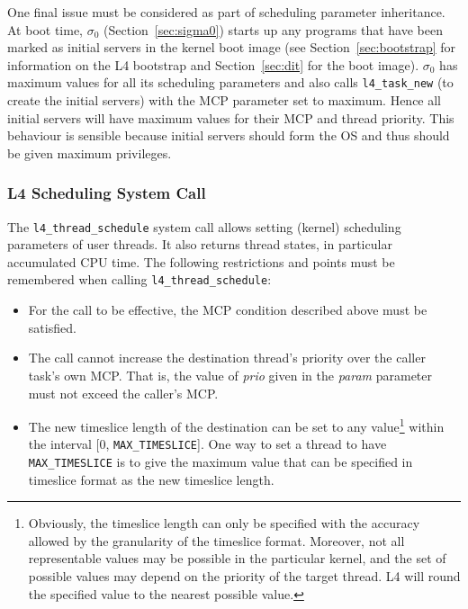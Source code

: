 One final issue must be considered as part of scheduling parameter
inheritance. At boot time, $\sigma_0$ (Section~\ref{sec:sigma0})
starts up any programs that have been marked as initial servers in the
kernel boot image (see Section~\ref{sec:bootstrap} for information on
the L4 bootstrap and Section~\ref{sec:dit} for the boot image).
$\sigma_0$ has maximum values for all its scheduling parameters and
also calls {\footnotesize\verb+l4_task_new+} (to create the initial servers) with the
MCP parameter set to maximum.  Hence all initial servers will have
maximum values for their MCP and thread priority. This behaviour is
sensible because initial servers should form the OS and thus should be
given maximum privileges.


\subsubsection{L4 Scheduling System Call}

The {\footnotesize\verb+l4_thread_schedule+} system call allows setting (kernel)
scheduling parameters of user threads.  It also returns thread states,
in particular accumulated CPU time. The following restrictions and
points must be remembered when calling {\footnotesize\verb+l4_thread_schedule+}:

\begin{itemize}
  
\item For the call to be effective, the MCP condition described above
  must be satisfied.

\item The call cannot increase the destination thread's priority over
  the caller task's own MCP. That is, the value of \emph{prio} given
  in the \emph{param} parameter must not exceed the caller's MCP.

\item The new timeslice length of the destination can be set to any
  value\footnote{Obviously, the timeslice length can only be specified
  with the accuracy allowed by the granularity of the timeslice
  format. Moreover, not all representable values may be possible in the
  particular kernel, and the set of possible values may depend on the
  priority of the target thread. L4 will round the specified value to
  the nearest possible value.} within the interval [0,
  {\footnotesize\verb+MAX_TIMESLICE+}]. One way to set a thread to have
  {\footnotesize\verb+MAX_TIMESLICE+} is to give the maximum value that
  can be specified in timeslice format as the new timeslice length.

\end{itemize}

